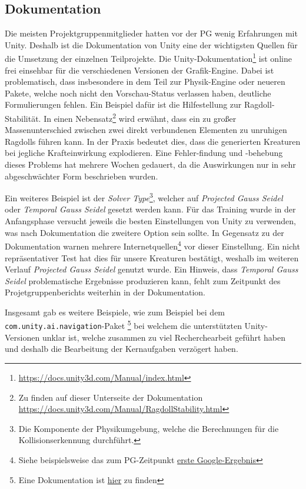 \subsection{Dokumentation} %
Die meisten Projektgruppenmitglieder hatten vor der PG wenig Erfahrungen mit Unity. Deshalb ist die Dokumentation von Unity eine der wichtigsten Quellen für die Umsetzung der einzelnen Teilprojekte. Die Unity-Dokumentation\footnote{\url{https://docs.unity3d.com/Manual/index.html}} ist online frei einsehbar für die verschiedenen Versionen der Grafik-Engine. Dabei ist problematisch, dass insbesondere in dem Teil zur Physik-Engine oder neueren Pakete, welche noch nicht den Vorschau-Status verlassen haben, deutliche Formulierungen fehlen. Ein Beispiel dafür ist die Hilfestellung zur Ragdoll-Stabilität. In einen Nebensatz\footnote{Zu finden auf dieser Unterseite der Dokumentation \url{https://docs.unity3d.com/Manual/RagdollStability.html}} wird erwähnt, dass ein zu großer Massenunterschied zwischen zwei direkt verbundenen Elementen zu unruhigen Ragdolls führen kann. In der Praxis bedeutet dies, dass die generierten Kreaturen bei jegliche Krafteinwirkung explodieren. Eine Fehler-findung und -behebung dieses Problems hat mehrere Wochen gedauert, da die Auswirkungen nur in sehr abgeschwächter Form beschrieben wurden.

Ein weiteres Beispiel ist der \emph{Solver Type}\footnote{Die Komponente der Physikumgebung, welche die Berechnungen für die Kollisionserkennung durchführt.}, welcher auf \emph{Projected Gauss Seidel} oder \emph{Temporal Gauss Seidel} gesetzt werden kann. Für das Training wurde in der Anfangsphase versucht jeweils die besten Einstellungen von Unity zu verwenden, was nach Dokumentation die zweitere Option sein sollte. In Gegensatz zu der Dokumentation warnen mehrere Internetquellen\footnote{Siehe beispielsweise das zum PG-Zeitpunkt \href{https://www.youtube.com/watch?v=aZ1zc6zZ61E}{erste Google-Ergebnis}} vor dieser Einstellung. Ein nicht repräsentativer Test hat dies für unsere Kreaturen bestätigt, weshalb im weiteren Verlauf \emph{Projected Gauss Seidel} genutzt wurde. Ein Hinweis, dass \emph{Temporal Gauss Seidel} problematische Ergebnisse produzieren kann, fehlt zum Zeitpunkt des Projetgruppenberichts weiterhin in der Dokumentation.

Insgesamt gab es weitere Beispiele, wie zum Beispiel bei dem \texttt{com.unity.ai.navigation}-Paket \footnote{Eine Dokumentation ist \href{https://docs.unity3d.com/Packages/com.unity.ai.navigation@1.0/manual/NavMeshSurface.html}{hier} zu finden} bei welchem die unterstützten Unity-Versionen unklar ist, welche zusammen zu viel Recherchearbeit geführt haben und deshalb die Bearbeitung der Kernaufgaben verzögert haben.


